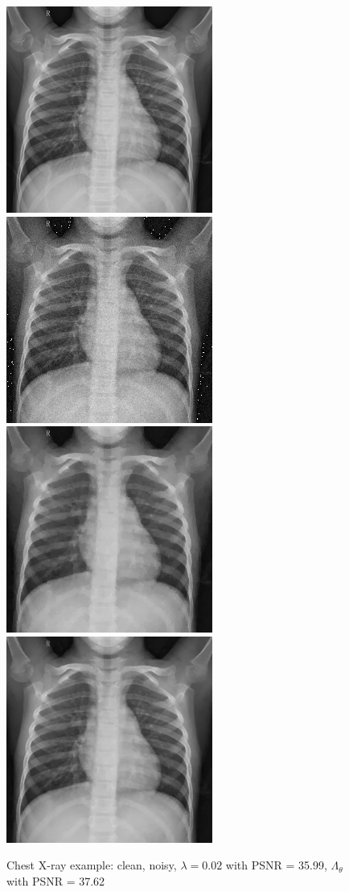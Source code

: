 \documentclass[12pt]{article}
\begin{document}
\begin{figure}[h]
    \centering
    \includegraphics[width=0.34\linewidth]{images//chest_xray/100-clean.png}
    \includegraphics[width=0.34\linewidth]{images//chest_xray/100-noisy.png}
    \includegraphics[width=0.34\linewidth]{images//chest_xray/100-psnr_35.99-lambda_0.02.png}
    \includegraphics[width=0.34\linewidth]{images//chest_xray/100-lambda_map-psnr_37.26-ssim_0.95.png}
    \caption{Chest X-ray example: clean, noisy, $\lambda = 0.02$ with PSNR = 35.99, $\Lambda_\theta$ with PSNR = 37.62}
    \label{fig:enter-label}
\end{figure}


\end{document}
